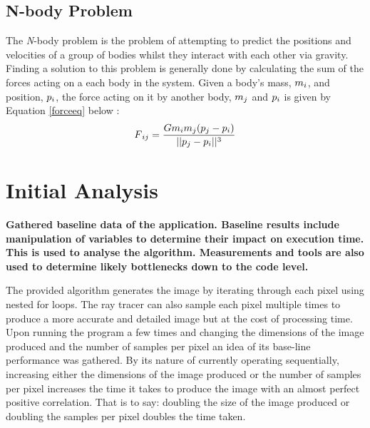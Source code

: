 \documentclass[12pt,journal,transmag]{IEEEtran}
\begin{document}
	\subsection{N-body Problem}
	The \textit{N}-body problem is the problem of attempting to predict the positions and velocities of a group of bodies whilst they interact with each other via gravity. Finding a solution to this problem is generally done by calculating the sum of the forces acting on a each body in the system. Given a body's mass, $m\textsubscript{$i$}$, and position, $p\textsubscript{$i$}$, the force acting on it by another body, $m\textsubscript{$j$}$ and $p\textsubscript{$i$}$ is given by Equation \ref{forceeq} below \cite{meyer}:
	\begin{equation} \label{forceeq} 
	F\textsubscript{$ij$} = \dfrac{Gm\textsubscript{$i$}m\textsubscript{$j$}(p\textsubscript{$j$} - p\textsubscript{$i$})}{||p\textsubscript{$j$} - p\textsubscript{$i$}||\textsuperscript{$3$}}
	\end{equation}
	
	\section{Initial Analysis}
	
	\textbf{Gathered baseline data of the application. Baseline results include manipulation of variables to determine their impact on execution time. This is used to analyse the algorithm. Measurements and tools are also used to determine likely bottlenecks down to the code level.}
	
	The provided algorithm generates the image by iterating through each pixel using nested for loops. The ray tracer can also sample each pixel multiple times to produce a more accurate and detailed image but at the cost of processing time. Upon running the program a few times and changing the dimensions of the image produced and the number of samples per pixel an idea of its base-line performance was gathered.  By its nature of currently operating sequentially, increasing either the dimensions of the image produced or the number of samples per pixel increases the time it takes to produce the image with an almost perfect positive correlation. That is to say: doubling the size of the image produced or doubling the samples per pixel doubles the time taken.\\
	
	
	
\end{document}
